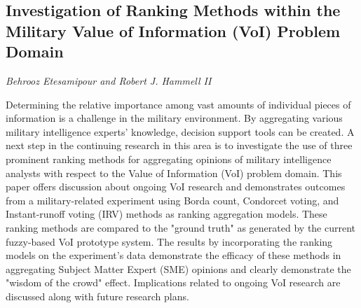 \documentclass[../booklet.tex]{subfiles}
\begin{document}
\subsection[Investigation of Ranking Methods within the Military Value of Information (VoI) Problem Domain. {\it Behrooz Etesamipour and Robert J. Hammell II}]{Investigation of Ranking Methods within the Military Value of Information (VoI) Problem Domain}
 

\begin{center}
  {\it Behrooz Etesamipour and Robert J. Hammell II}
\end{center}


Determining the relative importance among vast amounts of individual pieces of information is a challenge in the military environment. By aggregating various military intelligence experts' knowledge, decision support tools can be created. A next step in the continuing research in this area is to investigate the use of three prominent ranking methods for aggregating opinions of military intelligence analysts with respect to the Value of Information (VoI) problem domain. This paper offers discussion about ongoing VoI research and demonstrates outcomes from a military-related experiment using Borda count, Condorcet voting, and Instant-runoff voting (IRV) methods as ranking aggregation models. These ranking methods are compared to the "ground truth" as generated by the current fuzzy-based VoI prototype system. The results by incorporating the ranking models on the experiment's data demonstrate the efficacy of these methods in aggregating Subject Matter Expert (SME) opinions and clearly demonstrate the "wisdom of the crowd" effect. Implications related to ongoing VoI research are discussed along with future research plans.
\end{document}
